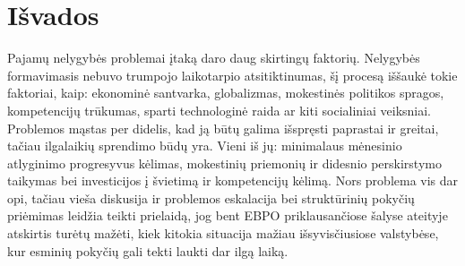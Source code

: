 \documentclass[12pt,a4paper,titlepage]{article}
\begin{document}
\newpage

\section{Išvados}
Pajamų nelygybės problemai įtaką daro daug skirtingų faktorių. Nelygybės formavimasis nebuvo trumpojo laikotarpio atsitiktinumas, šį procesą iššaukė tokie faktoriai, kaip: ekonominė santvarka, globalizmas, mokestinės politikos spragos, kompetencijų trūkumas, sparti technologinė raida ar kiti socialiniai veiksniai. Problemos  mąstas per didelis, kad ją būtų galima išspręsti paprastai ir greitai, tačiau ilgalaikių sprendimo būdų yra. Vieni iš jų:   minimalaus mėnesinio atlyginimo progresyvus kėlimas, mokestinių priemonių ir didesnio perskirstymo taikymas bei investicijos į švietimą ir kompetencijų kėlimą. Nors problema vis dar opi, tačiau vieša diskusija ir problemos eskalacija bei struktūrinių pokyčių priėmimas leidžia teikti prielaidą, jog bent EBPO priklausančiose šalyse ateityje atskirtis turėtų mažėti, kiek kitokia situacija mažiau išsyvisčiusiose valstybėse, kur esminių pokyčių gali tekti laukti dar ilgą laiką. 

\newpage
\nocite{*}
\printbibliography[title={Literatūra}]
\end{document}
